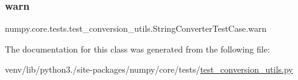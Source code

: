 \subsubsection{\texorpdfstring{warn}{warn}}
{\footnotesize\ttfamily numpy.\+core.\+tests.\+test\+\_\+conversion\+\_\+utils.\+String\+Converter\+Test\+Case.\+warn\hspace{0.3cm}{\ttfamily [static]}}



The documentation for this class was generated from the following file\+:\begin{DoxyCompactItemize}
\item 
venv/lib/python3./site-\/packages/numpy/core/tests/\hyperlink{test__conversion__utils_8py}{test\+\_\+conversion\+\_\+utils.\+py}\end{DoxyCompactItemize}
